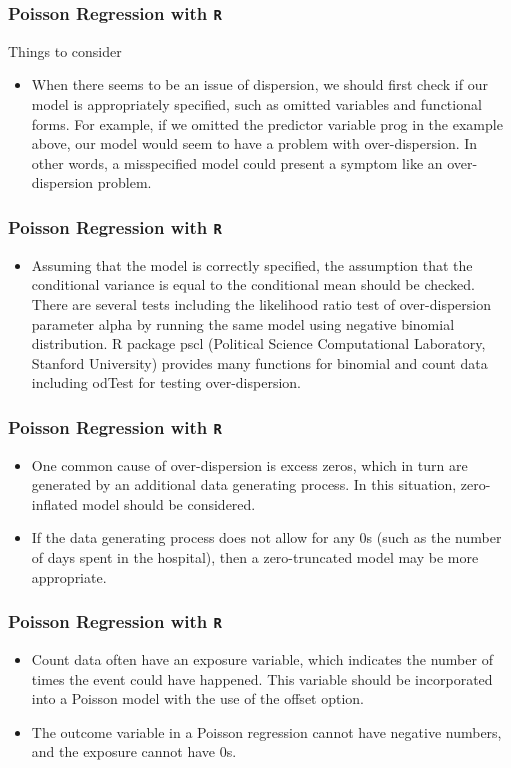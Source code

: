 \documentclass[00-GLMregslides.tex]{subfiles}
\begin{document}
\begin{frame}[fragile]

\frametitle{Poisson Regression with \texttt{R}}
\Large
Things to consider
\begin{itemize}

 \item When there seems to be an issue of dispersion, we should first check if our model is appropriately specified, such as omitted variables and functional forms. For example, if we omitted the predictor variable prog in the example above, our model would seem to have a problem with over-dispersion. In other words, a misspecified model could present a symptom like an over-dispersion problem. 
\end{itemize}
\end{frame}
\begin{frame}[fragile]
\frametitle{Poisson Regression with \texttt{R}}
	\Large
\begin{itemize}
\item Assuming that the model is correctly specified, the assumption that the conditional variance is equal to the conditional mean should be checked. There are several tests including the likelihood ratio test of over-dispersion parameter alpha by running the same model using negative binomial distribution. R package pscl (Political Science Computational Laboratory, Stanford University) provides many functions for binomial and count data including odTest for testing over-dispersion. 
\end{itemize}
\end{frame}
\begin{frame}[fragile]
	\frametitle{Poisson Regression with \texttt{R}}
	\Large
	\begin{itemize}
\item One common cause of over-dispersion is excess zeros, which in turn are generated by an additional data generating process. In this situation, zero-inflated model should be considered.
\item If the data generating process does not allow for any 0s (such as the number of days spent in the hospital), then a zero-truncated model may be more appropriate.
\end{itemize}
\end{frame}
\begin{frame}[fragile]
	\frametitle{Poisson Regression with \texttt{R}}
	\Large
	\begin{itemize} 
\item Count data often have an exposure variable, which indicates the number of times the event could have happened. This variable should be incorporated into a Poisson model with the use of the offset option.
\item The outcome variable in a Poisson regression cannot have negative numbers, and the exposure cannot have 0s.
\end{itemize}
\end{frame}
\end{document}
